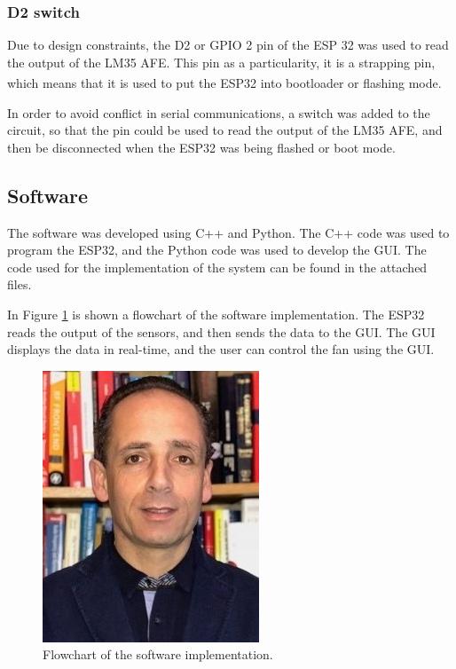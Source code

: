 \documentclass[12pt]{article}
\begin{document}
\subsubsection{D2 switch}
Due to design constraints, the D2 or GPIO 2 pin of the ESP 32 was used to read the output of the LM35 AFE. This pin as a particularity, it is a strapping pin, which means that it is used to put the ESP32 into bootloader or flashing mode\textsuperscript{\cite{ESP-IDF-Programming-Guide}}.

In order to avoid conflict in serial communications, a switch was added to the circuit, so that the pin could be used to read the output of the LM35 AFE, and then be disconnected when the ESP32 was being flashed or boot mode. 

\subsection{Software}
The software was developed using C++ and Python. The C++ code was used to program the ESP32, and the Python code was used to develop the GUI. The code used for the implementation of the system can be found in the attached files.

In Figure \ref{fig:flowchart} is shown a flowchart of the software implementation. The ESP32 reads the output of the sensors, and then sends the data to the GUI. The GUI displays the data in real-time, and the user can control the fan using the GUI.

\begin{figure}[H] 
    \centering
    \includegraphics*[scale = 0.8]{images/jpoliveira.jpg}
    \caption{Flowchart of the software implementation.}
    \label{fig:flowchart}
\end{figure}
\end{document}
